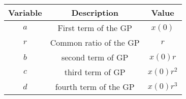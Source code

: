 \begin{tabular}[12.1pt]{ |c| c| c|}
    \hline
    \textbf{Variable} & \textbf{Description} &\textbf{Value}\\ 
    \hline
    $a$ & First term of the GP & $x(0)$ \\
    \hline 
    $r$ & Common ratio of the GP & $r$ \\
    \hline 
    $b$ & second term of GP & $x(0)r$\\
    \hline
   $c$ & third term of GP & $x(0)r^2$\\
   \hline
   $d$ &fourth term of the GP & $x(0)r^3$\\
   \hline
    \end{tabular}
